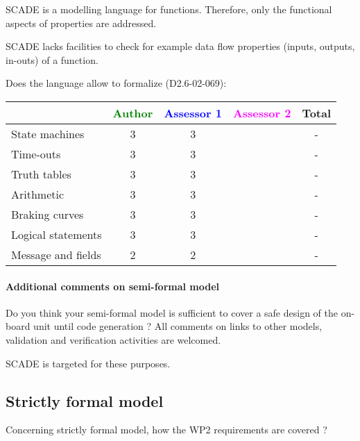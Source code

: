 \begin{author_comment}
SCADE is a modelling language for functions. Therefore, only the functional aspects of properties are addressed.  
\end{author_comment}


\begin{assessor1}
  SCADE lacks facilities to check for example data flow properties
  (inputs, outputs, in-outs) of a function.
\end{assessor1}


Does the language allow to  formalize (D2.6-02-069):

\begin{tabular}{|l | c | c | c | c|}
\hline
& \textcolor{green}{Author} & \textcolor{blue}{Assessor 1} & \textcolor{magenta}{Assessor 2} & Total \\
\hline 
State machines  & 3 & 3 & & - \\
\hline
Time-outs  & 3 & 3 & & - \\
\hline
Truth tables  & 3 & 3 & & - \\
\hline
Arithmetic  & 3 & 3 & & - \\
\hline
Braking curves  & 3 & 3 & & - \\
\hline
Logical statements & 3 & 3 & & - \\
\hline
Message and fields & 2 & 2 & & - \\
\hline
\end{tabular}

\paragraph{Additional comments on semi-formal  model} Do you think your semi-formal  model is sufficient to cover a safe design of the on-board unit until code generation ?
All comments on links to  other models, validation and verification activities are welcomed.

\begin{author_comment}
SCADE is targeted for these purposes.   
\end{author_comment}


\subsection{Strictly formal model}

Concerning strictly formal model, how the WP2 requirements are covered ?


